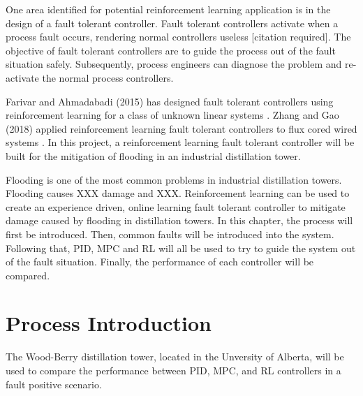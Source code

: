 One area identified for potential reinforcement learning application is in the design of a fault tolerant controller.  Fault tolerant controllers activate when a process fault occurs, rendering normal controllers useless [citation required]. The objective of fault tolerant controllers are to guide the process out of the fault situation safely.  Subsequently, process engineers can diagnose the problem and re-activate the normal process controllers.  

Farivar and Ahmadabadi (2015) has designed fault tolerant controllers using reinforcement learning for a class of unknown linear systems \cite{ahmad}.  Zhang and Gao (2018) applied reinforcement learning fault tolerant controllers to flux cored wired systems \cite{zhang_gao}.  In this project, a reinforcement learning fault tolerant controller will be built for the mitigation of flooding in an industrial distillation tower. 

Flooding is one of the most common problems in industrial distillation towers.  Flooding causes XXX damage and XXX. Reinforcement learning can be used to create an experience driven, online learning fault tolerant controller to mitigate damage caused by flooding in distillation towers.  In this chapter, the process will first be introduced. Then, common faults will be introduced into the system.  Following that, PID, MPC and RL will all be used to try to guide the system out of the fault situation.  Finally, the performance of each controller will be compared.

\section{Process Introduction}
The Wood-Berry distillation tower, located in the Unversity of Alberta, will be used to compare the performance between PID, MPC, and RL controllers in a fault positive scenario.  

